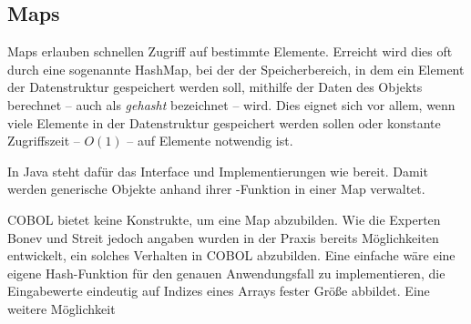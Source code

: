 \subsection{Maps}
Maps erlauben schnellen Zugriff auf bestimmte Elemente. Erreicht wird dies oft durch eine sogenannte HashMap, bei der der Speicherbereich, in dem ein Element der Datenstruktur gespeichert werden soll, mithilfe der Daten des Objekts berechnet -- auch als \textit{gehasht} bezeichnet -- wird. Dies eignet sich vor allem, wenn viele Elemente in der Datenstruktur gespeichert werden sollen oder konstante Zugriffszeit -- $O(1)$ -- auf Elemente notwendig ist.

In Java steht dafür das Interface  und Implementierungen wie  bereit. Damit werden generische Objekte anhand ihrer -Funktion in einer Map verwaltet.

COBOL bietet keine Konstrukte, um eine Map abzubilden. Wie die Experten Bonev und Streit jedoch angaben wurden in der Praxis bereits Möglichkeiten entwickelt, ein solches Verhalten in COBOL abzubilden. Eine einfache wäre eine eigene Hash-Funktion für den genauen Anwendungsfall zu implementieren, die Eingabewerte eindeutig auf Indizes eines Arrays fester Größe abbildet. Eine weitere Möglichkeit 
